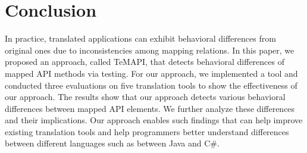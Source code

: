 \section{Conclusion}
\label{sec:conclusion}

In practice, translated applications can exhibit behavioral differences from original ones due to inconsistencies among mapping relations. In this paper, we proposed an approach, called TeMAPI, that detects behavioral differences of mapped API methods via testing. For our approach, we implemented a tool and conducted three evaluations on five translation tools to show the effectiveness of our approach. The results show that our approach detects various behavioral differences between mapped API elements. We further analyze these differences and their implications. Our approach enables such findings that can help improve existing translation tools and help programmers better understand differences between different languages such as between Java and C\#.


